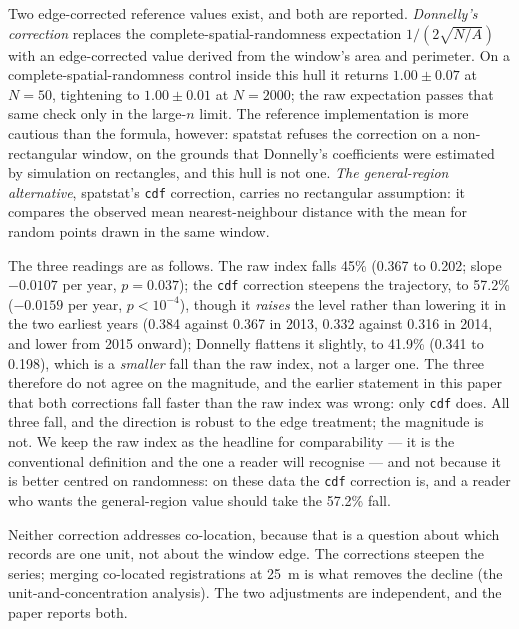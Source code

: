 \documentclass[fleqn,10pt,lineno]{wlpeerj}
\newcommand{\hullLocOlsP}{0.037}
\newcommand{\locHullDrop}{45}
\begin{document}
Two edge-corrected reference values exist, and both are reported.
\emph{Donnelly's correction} \citep{donnelly1978simulations} replaces the
complete-spatial-randomness expectation
$1/(2\sqrt{N/A})$ with an edge-corrected value derived from the window's area and perimeter. On a
complete-spatial-randomness control inside this hull it returns $\num{1.00} \pm \num{0.07}$ at
$N = 50$, tightening to $\num{1.00} \pm \num{0.01}$ at $N = 2000$; the raw expectation passes
that same check only in the large-$n$ limit. The reference implementation
\citep{baddeley2005spatstat} is more cautious than
the formula, however: \textsf{spatstat} refuses the correction on a non-rectangular window, on the
grounds that Donnelly's coefficients were estimated by simulation on rectangles, and this hull is
not one. \emph{The general-region alternative}, \textsf{spatstat}'s \texttt{cdf} correction,
carries no rectangular assumption: it compares the observed mean nearest-neighbour distance with
the mean for random points drawn in the same window.

The three readings are as follows. The raw index falls \locHullDrop\% (\num{0.367} to
\num{0.202}; slope $-0.0107$ per year, $p = \hullLocOlsP$); the \texttt{cdf} correction
steepens the trajectory, to \num{57.2}\% ($-0.0159$ per year, $p < 10^{-4}$), though it
\emph{raises} the level rather than lowering it in the two earliest years
(\num{0.384} against \num{0.367} in 2013, \num{0.332} against \num{0.316} in 2014, and lower
from 2015 onward); Donnelly flattens it slightly, to \num{41.9}\% (\num{0.341} to
\num{0.198}), which is a \emph{smaller} fall than the raw index, not a larger one. The three
therefore do not agree on the magnitude, and the earlier statement in this paper that both
corrections fall faster than the raw index was wrong: only \texttt{cdf} does. All three fall, and
the direction is robust to the edge treatment; the magnitude is not. We keep the raw index as
the headline for comparability --- it is the
conventional definition and the one a reader will recognise --- and not because it is better
centred on randomness: on these data the \texttt{cdf} correction is, and a reader who wants the
general-region value should take the \num{57.2}\% fall.

Neither correction addresses co-location, because that is a question about which records are one
unit, not about the window edge. The corrections steepen the series; merging co-located
registrations at \SI{25}{\meter} is what removes the decline (the unit-and-concentration analysis).
The two adjustments are independent, and the paper reports both.
\end{document}
